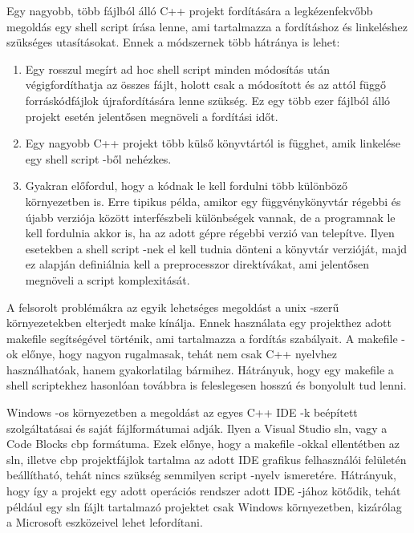 \vspace{3mm}


\vspace{2mm}

\noindent Egy nagyobb, 
több fájlból álló C++ projekt fordítására 
a legkézenfekvőbb megoldás egy shell script írása lenne, 
ami tartalmazza a fordításhoz és linkeléshez szükséges utasításokat. 
Ennek a módszernek több hátránya is lehet:
\begin{enumerate}
\item 
Egy rosszul megírt ad hoc shell script 
minden módosítás után végigfordíthatja az összes fájlt, 
holott csak a módosított 
és az attól függő forráskódfájlok újrafordítására lenne szükség. 
Ez egy több ezer fájlból álló projekt esetén 
jelentősen megnöveli a fordítási időt. 
\item 
Egy nagyobb C++ projekt több külső könyvtártól is függhet, 
amik linkelése egy shell script -ből nehézkes.
\item Gyakran előfordul, 
hogy a kódnak le kell fordulni több különböző környezetben is. 
Erre tipikus példa, 
amikor egy függvénykönyvtár régebbi és újabb verziója között 
interfészbeli különbségek vannak, 
de a programnak le kell fordulnia akkor is, 
ha az adott gépre régebbi verzió van telepítve. 
Ilyen esetekben a shell script -nek el kell tudnia dönteni 
a könyvtár verzióját, 
majd ez alapján definiálnia kell a preprocesszor direktívákat, 
ami jelentősen megnöveli a script komplexitását.
\end{enumerate}
A felsorolt problémákra az egyik lehetséges megoldást 
a unix -szerű környezetekben elterjedt make kínálja. 
Ennek használata egy projekthez adott makefile segítségével történik, 
ami tartalmazza a fordítás szabályait. 
A makefile -ok előnye, hogy nagyon rugalmasak, 
tehát nem csak C++ nyelvhez használhatóak, 
hanem gyakorlatilag bármihez. 
Hátrányuk, hogy egy makefile a shell scriptekhez hasonlóan 
továbbra is feleslegesen hosszú és bonyolult tud lenni.

Windows -os környezetben a megoldást 
az egyes C++ IDE -k beépített szolgáltatásai és 
saját fájlformátumai adják. 
Ilyen a Visual Studio sln, 
vagy a Code Blocks cbp formátuma. Ezek előnye, 
hogy a makefile -okkal ellentétben az sln, 
illetve cbp projektfájlok tartalma 
az adott IDE grafikus felhasználói felületén beállítható, 
tehát nincs szükség semmilyen script -nyelv ismeretére. 
Hátrányuk, hogy így a projekt egy adott operációs rendszer 
adott IDE -jához kötődik, 
tehát például egy sln fájlt tartalmazó projektet csak Windows környezetben, 
kizárólag a Microsoft eszközeivel lehet lefordítani.

